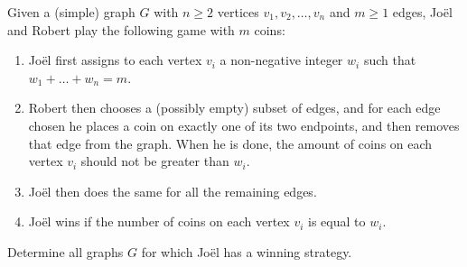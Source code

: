 Given a (simple) graph $G$ with $n\geq 2$ vertices $v_1, v_2, \dots, v_n$ and $m\geq 1$ edges,
Joël and Robert play the following game with $m$ coins:
\begin{enumerate}
    \item Joël first assigns to each vertex $v_i$ a non-negative integer $w_i$ such that $w_1 + \dots + w_n = m$.
    \item Robert then chooses a (possibly empty) subset of edges,
and for each edge chosen he places a coin on exactly one of its two endpoints,
and then removes that edge from the graph.
When he is done, the amount of coins on each vertex $v_i$ should not be greater than $w_i$. 
    \item Joël then does the same for all the remaining edges.
    \item Joël wins if the number of coins on each vertex $v_i$ is equal to $w_i$.
\end{enumerate}
Determine all graphs $G$ for which Joël has a winning strategy.
